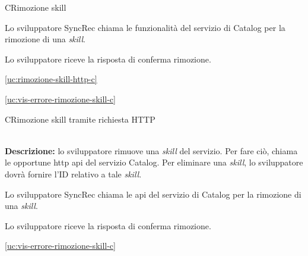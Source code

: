 \begin{usecase}{9}{C}{Rimozione skill}



	\begin{ucscenarioprincipale}
		\item Lo sviluppatore SyncRec chiama le funzionalità del servizio di Catalog per la rimozione di una \textit{skill}.
		\item Lo sviluppatore riceve la risposta di conferma rimozione.
	\end{ucscenarioprincipale}


	\begin{ucgeneralizzazioni}
		\item \ref{uc:rimozione-skill-http-c}
	\end{ucgeneralizzazioni}

	\begin{ucestensioni}
		\item \ref{uc:vis-errore-rimozione-skill-c}
	\end{ucestensioni}

	\label{uc:rimozione-skill-c}
\end{usecase}

\begin{usecase}{10}{C}{Rimozione skill tramite richiesta HTTP}


	\textbf{\\Descrizione:} lo sviluppatore rimuove una \textit{skill} del servizio. Per fare ciò, chiama le opportune \acrshort{http} \acrshort{api} del servizio Catalog. Per eliminare una \textit{skill}, lo sviluppatore dovrà fornire l'ID relativo a tale \textit{skill}.

	\begin{ucscenarioprincipale}
		\item Lo sviluppatore SyncRec chiama le \acrshort{api} del servizio di Catalog per la rimozione di una \textit{skill}.
		\item Lo sviluppatore riceve la risposta di conferma rimozione.
	\end{ucscenarioprincipale}


	\begin{ucestensioni}
		\item \ref{uc:vis-errore-rimozione-skill-c}
	\end{ucestensioni}

	\label{uc:rimozione-skill-http-c}
\end{usecase}


